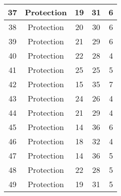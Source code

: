 \documentclass[results.tex]{subfiles}
\begin{document}
\begin{center}
\begin{tabular}{| c || c | c | c | c |}
            \hline
            37                      & Protection                   & 19                     & 31                      & 6                    \\
            \hline
            38                      & Protection                   & 20                     & 30                      & 6                    \\
            \hline
            39                      & Protection                   & 21                     & 29                      & 6                    \\
            \hline
            40                      & Protection                   & 22                     & 28                      & 4                    \\
            \hline
            41                      & Protection                   & 25                     & 25                      & 5                    \\
            \hline
            42                      & Protection                   & 15                     & 35                      & 7                    \\
            \hline
            43                      & Protection                   & 24                     & 26                      & 4                    \\
            \hline
            44                      & Protection                   & 21                     & 29                      & 4                    \\
            \hline
            45                      & Protection                   & 14                     & 36                      & 6                    \\
            \hline
            46                      & Protection                   & 18                     & 32                      & 4                    \\
            \hline
            47                      & Protection                   & 14                     & 36                      & 5                    \\
            \hline
            48                      & Protection                   & 22                     & 28                      & 5                    \\
            \hline
            49                      & Protection                   & 19                     & 31                      & 5                    \\
            \hline
        \end{tabular}
    \end{center}
\end{document}
